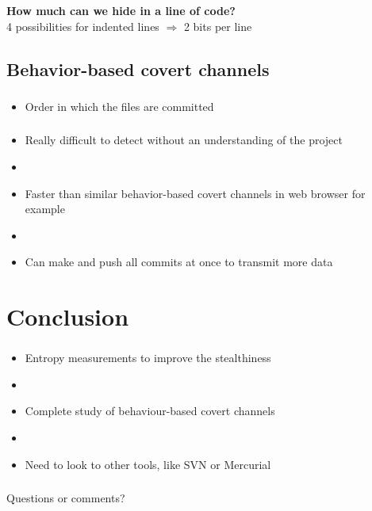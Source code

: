 \documentclass{beamer}
\begin{document}
\begin{frame}
  \frametitle{\insertsubsectionhead}
  \textbf{How much can we hide in a line of code?}\\
  4 possibilities for indented lines $\Rightarrow$ 2 bits per line
\end{frame}

\subsection{Behavior-based covert channels}

\begin{frame}
  \frametitle{\insertsubsectionhead}
  \begin{itemize}
  \item Order in which the files are committed
   \end{itemize}
\end{frame}

\begin{frame}
  \frametitle{\insertsubsectionhead}
\begin{itemize}
  \item Really difficult to detect without an understanding of the project
  \item []
  \item Faster than similar behavior-based covert channels in web browser for example
  \item []  
  \item Can make and push all commits at once to transmit more data 
\end{itemize}
\end{frame}

\section{Conclusion}

\begin{frame}
\frametitle{\insertsectionhead}
\begin{itemize}
	\item Entropy measurements to improve the stealthiness
    \item []
    \item Complete study of behaviour-based covert channels
    \item []
	\item Need to look to other tools, like SVN or Mercurial
\end{itemize}
\end{frame}

\begin{frame}
  \frametitle{\insertsectionhead}
  Questions or comments?
\end{frame}
\end{document}
